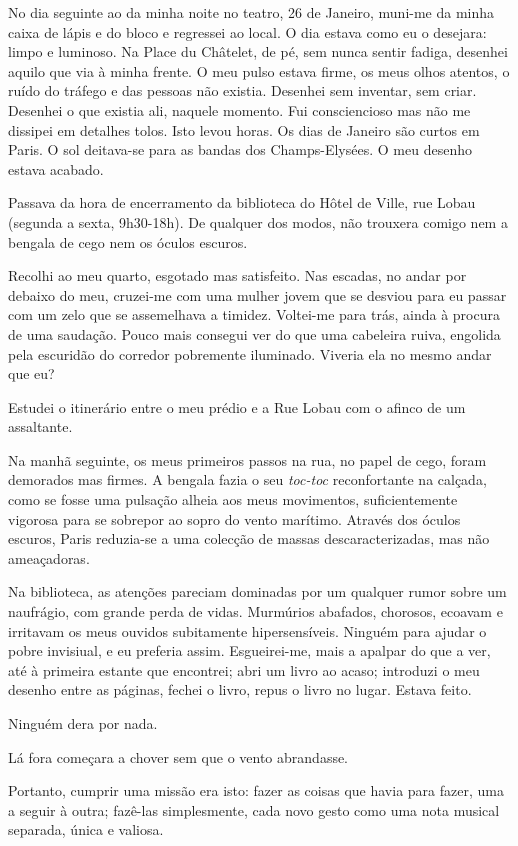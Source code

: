 No dia seguinte ao da minha noite no teatro, 26 de Janeiro, muni-me da
minha caixa de lápis e do bloco e regressei ao local. O dia estava como
eu o desejara: limpo e luminoso. Na Place du Châtelet, de pé, sem nunca
sentir fadiga, desenhei aquilo que via à minha frente. O meu pulso
estava firme, os meus olhos atentos, o ruído do tráfego e das pessoas
não existia. Desenhei sem inventar, sem criar. Desenhei o que existia
ali, naquele momento. Fui consciencioso mas não me dissipei em detalhes
tolos. Isto levou horas. Os dias de Janeiro são curtos em Paris. O sol
deitava-se para as bandas dos Champs-Elysées. O meu desenho estava acabado.

Passava da hora de encerramento da biblioteca do Hôtel de Ville, rue
Lobau (segunda a sexta, 9h30-18h). De qualquer dos modos, não trouxera
comigo nem a bengala de cego nem os óculos escuros.

Recolhi ao meu quarto, esgotado mas satisfeito. Nas escadas, no andar
por debaixo do meu, cruzei-me com uma mulher jovem que se desviou para
eu passar com um zelo que se assemelhava a timidez. Voltei-me para trás,
ainda à procura de uma saudação. Pouco mais consegui ver do que uma
cabeleira ruiva, engolida pela escuridão do corredor pobremente iluminado. Viveria ela no mesmo andar que eu?

Estudei o itinerário entre o meu prédio e a Rue Lobau com o afinco de um
assaltante.

Na manhã seguinte, os meus primeiros passos na rua, no papel de cego,
foram demorados mas firmes. A bengala fazia
o seu \emph{toc-toc }reconfortante na calçada, como se fosse uma pulsação alheia aos meus movimentos, suficientemente vigorosa para se
sobrepor ao sopro do vento marítimo. Através dos óculos escuros, Paris
reduzia-se a uma colecção de massas descaracterizadas, mas não
ameaçadoras.

Na biblioteca, as atenções pareciam dominadas por um qualquer rumor
sobre um naufrágio, com grande perda de vidas. Murmúrios abafados,
chorosos, ecoavam e irritavam os meus ouvidos subitamente
hipersensíveis. Ninguém para ajudar o pobre invisiual, e eu preferia
assim. Esgueirei-me, mais a apalpar do que a ver, até à primeira estante
que encontrei; abri um livro ao acaso; introduzi o meu desenho entre
as páginas, fechei o livro, repus o livro no lugar. Estava feito.

Ninguém dera por nada.

Lá fora começara a chover sem que o vento abrandasse.

Portanto, cumprir uma missão era isto: fazer as coisas que havia para
fazer, uma a seguir à outra; fazê-las simplesmente, cada novo gesto como
uma nota musical separada, única e valiosa.

